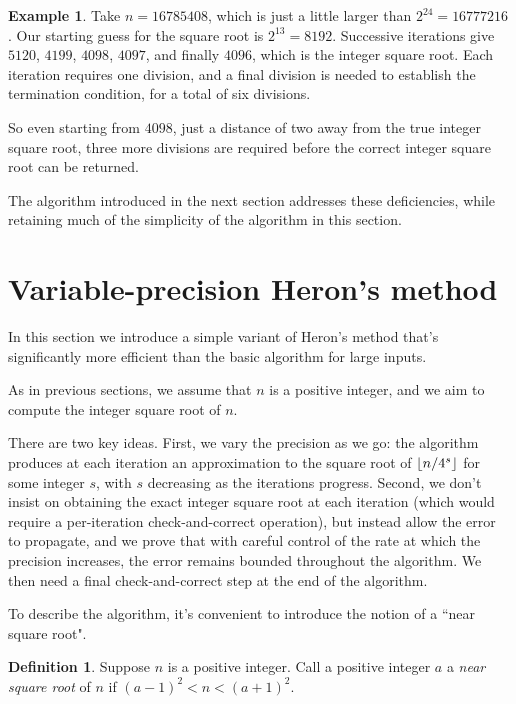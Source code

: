 \documentclass[a4paper]{article}
\DeclarePairedDelimiter\floor{\lfloor}{\rfloor}
\theoremstyle{plain}
\theoremstyle{definition}
\newtheorem{definition}[theorem]{Definition}
\newtheorem{example}[theorem]{Example}
\begin{document}
\begin{example}
  Take $n = 16785408$, which is just a little larger than $2^{24} = 16777216$.
  Our starting guess for the square root is $2^{13} = 8192$. Successive
  iterations give $5120$, $4199$, $4098$, $4097$, and finally $4096$, which
  is the integer square root. Each iteration requires one division, and
  a final division is needed to establish the termination condition, for
  a total of six divisions.
\end{example}

So even starting from $4098$, just a distance of two away from the true integer
square root, three more divisions are required before the correct integer
square root can be returned.

The algorithm introduced in the next section addresses these deficiencies,
while retaining much of the simplicity of the algorithm in this section.

\section{Variable-precision Heron's method}

In this section we introduce a simple variant of Heron's method that's
significantly more efficient than the basic algorithm for large inputs.

As in previous sections, we assume that $n$ is a positive integer, and we
aim to compute the integer square root of $n$.

There are two key ideas. First, we vary the precision as we go: the algorithm
produces at each iteration an approximation to the square root of
$\floor{n/4^s}$ for some integer $s$, with $s$ decreasing as the iterations
progress. Second, we don't insist on obtaining the exact integer square root at
each iteration (which would require a per-iteration check-and-correct
operation), but instead allow the error to propagate, and we prove
that with careful control of the rate at which the precision
increases, the error remains bounded throughout the algorithm. We then need a
final check-and-correct step at the end of the algorithm.

To describe the algorithm, it's convenient to introduce the notion of a
``near square root".

\begin{definition}
  Suppose $n$ is a positive integer. Call a positive integer $a$ a
  \emph{near square root} of $n$ if $(a - 1)^2 < n < (a + 1)^2$.
\end{definition}
\end{document}
